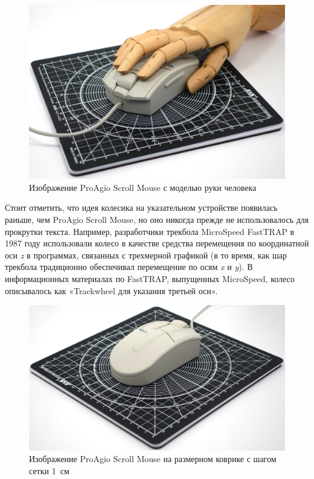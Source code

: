 \documentclass[11pt, a4paper]{article}
\begin{document}
\begin{figure}[h]
    \centering
    \includegraphics[scale=0.3]{1995_pro_agio_scroll_mouse/hand_30.jpg}
    \caption{Изображение ProAgio Scroll Mouse с моделью руки человека}
    \label{fig:ScrollHand}
    \end{figure}

Стоит отметить, что идея колесика на указательном устройстве появилась раньше, чем ProAgio Scroll Mouse, но оно никогда прежде не использовалось для прокрутки текста. Например, разработчики трекбола MicroSpeed FastTRAP в 1987 году использовали колесо в качестве средства перемещения по координатной оси \textit{z} в программах, связанных с трехмерной графикой (в то время, как шар трекбола традиционно обеспечивал перемещение по осям \textit{x} и \textit{y}). В информационных материалах по FastTRAP, выпущенных MicroSpeed, колесо описывалось как «Trackwheel для указания третьей оси».

\begin{figure}[h]
    \centering
    \includegraphics[scale=0.37]{1995_pro_agio_scroll_mouse/size_30.jpg}
    \caption{Изображение ProAgio Scroll Mouse на размерном коврике с шагом сетки 1~см}
    \label{fig:ScrollSize}
\end{figure}
\end{document}
